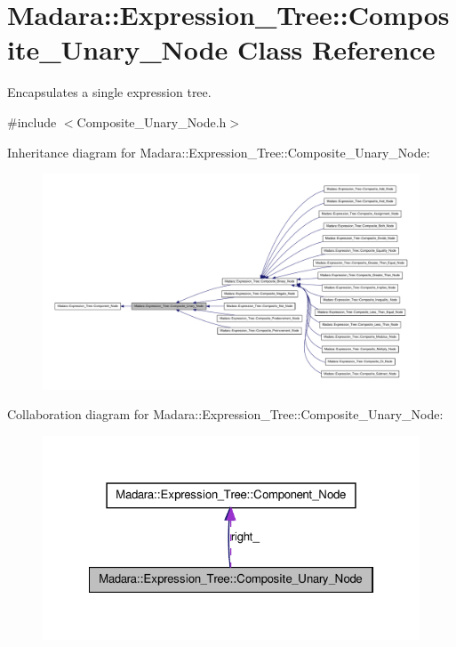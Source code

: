 \hypertarget{classMadara_1_1Expression__Tree_1_1Composite__Unary__Node}{
\section{Madara::Expression\_\-Tree::Composite\_\-Unary\_\-Node Class Reference}
\label{d3/dc7/classMadara_1_1Expression__Tree_1_1Composite__Unary__Node}
}


Encapsulates a single expression tree.  




{\ttfamily \#include $<$Composite\_\-Unary\_\-Node.h$>$}



Inheritance diagram for Madara::Expression\_\-Tree::Composite\_\-Unary\_\-Node:
\nopagebreak
\begin{figure}[H]
\begin{center}
\leavevmode
\includegraphics[width=400pt]{d2/d15/classMadara_1_1Expression__Tree_1_1Composite__Unary__Node__inherit__graph}
\end{center}
\end{figure}


Collaboration diagram for Madara::Expression\_\-Tree::Composite\_\-Unary\_\-Node:
\nopagebreak
\begin{figure}[H]
\begin{center}
\leavevmode
\includegraphics[width=322pt]{db/d8b/classMadara_1_1Expression__Tree_1_1Composite__Unary__Node__coll__graph}
\end{center}
\end{figure}
